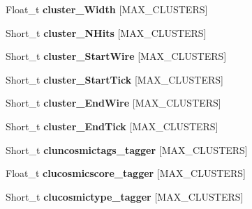 \begin{DoxyCompactItemize}
\item 
\hypertarget{classanatree_a9240388979e46e4338b8f4a819ea34ff}{Float\-\_\-t {\bfseries cluster\-\_\-\-Width} \mbox{[}M\-A\-X\-\_\-\-C\-L\-U\-S\-T\-E\-R\-S\mbox{]}}\label{classanatree_a9240388979e46e4338b8f4a819ea34ff}

\item 
\hypertarget{classanatree_ae64b28cc588826048d6665ca84e0b7da}{Short\-\_\-t {\bfseries cluster\-\_\-\-N\-Hits} \mbox{[}M\-A\-X\-\_\-\-C\-L\-U\-S\-T\-E\-R\-S\mbox{]}}\label{classanatree_ae64b28cc588826048d6665ca84e0b7da}

\item 
\hypertarget{classanatree_a182c7fb3a2086ad0373d522e931f82c7}{Short\-\_\-t {\bfseries cluster\-\_\-\-Start\-Wire} \mbox{[}M\-A\-X\-\_\-\-C\-L\-U\-S\-T\-E\-R\-S\mbox{]}}\label{classanatree_a182c7fb3a2086ad0373d522e931f82c7}

\item 
\hypertarget{classanatree_a401ba755fe4050cb3fdd2c432374abb5}{Short\-\_\-t {\bfseries cluster\-\_\-\-Start\-Tick} \mbox{[}M\-A\-X\-\_\-\-C\-L\-U\-S\-T\-E\-R\-S\mbox{]}}\label{classanatree_a401ba755fe4050cb3fdd2c432374abb5}

\item 
\hypertarget{classanatree_a44f1514692e996efab1aa5e025540ff3}{Short\-\_\-t {\bfseries cluster\-\_\-\-End\-Wire} \mbox{[}M\-A\-X\-\_\-\-C\-L\-U\-S\-T\-E\-R\-S\mbox{]}}\label{classanatree_a44f1514692e996efab1aa5e025540ff3}

\item 
\hypertarget{classanatree_a43b238c8923fbf44a4e02c6c615ba82e}{Short\-\_\-t {\bfseries cluster\-\_\-\-End\-Tick} \mbox{[}M\-A\-X\-\_\-\-C\-L\-U\-S\-T\-E\-R\-S\mbox{]}}\label{classanatree_a43b238c8923fbf44a4e02c6c615ba82e}

\item 
\hypertarget{classanatree_a9c829d190955933229088e452846ea7b}{Short\-\_\-t {\bfseries cluncosmictags\-\_\-tagger} \mbox{[}M\-A\-X\-\_\-\-C\-L\-U\-S\-T\-E\-R\-S\mbox{]}}\label{classanatree_a9c829d190955933229088e452846ea7b}

\item 
\hypertarget{classanatree_a0ffbb34cd1be47925f21fe56c6d3a9e4}{Float\-\_\-t {\bfseries clucosmicscore\-\_\-tagger} \mbox{[}M\-A\-X\-\_\-\-C\-L\-U\-S\-T\-E\-R\-S\mbox{]}}\label{classanatree_a0ffbb34cd1be47925f21fe56c6d3a9e4}

\item 
\hypertarget{classanatree_ae283ea887bcf0e7daafd4b4966caa63b}{Short\-\_\-t {\bfseries clucosmictype\-\_\-tagger} \mbox{[}M\-A\-X\-\_\-\-C\-L\-U\-S\-T\-E\-R\-S\mbox{]}}\label{classanatree_ae283ea887bcf0e7daafd4b4966caa63b}


\end{DoxyCompactItemize}
